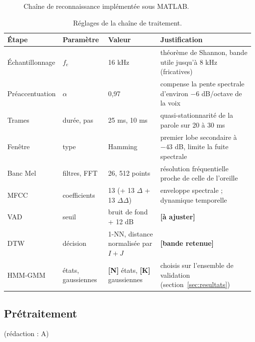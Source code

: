 \documentclass[11pt,a4paper]{article}
\newcommand{\ar}[1]{\colorbox{jaune}{\textbf{\small [#1]}}}            %
\newcommand{\redaction}[1]{\hfill{\small\color{gray}(rédaction : #1)}}   %
\begin{document}
\begin{figure}[H]\centering
{}
\caption{Chaîne de reconnaissance implémentée sous MATLAB.}\label{fig:chaine}
\end{figure}

\begin{table}[H]\centering\small
\begin{tabularx}{\linewidth}{llLL}
\toprule
Étape & Paramètre & Valeur & Justification \\
\midrule
Échantillonnage & $f_e$ & 16 kHz & théorème de Shannon, bande utile jusqu'à 8 kHz (fricatives) \\
Préaccentuation & $\alpha$ & 0,97 & compense la pente spectrale d'environ $-6$ dB/octave de la voix \\
Trames & durée, pas & 25 ms, 10 ms & quasi-stationnarité de la parole sur 20 à 30 ms \\
Fenêtre & type & Hamming & premier lobe secondaire à $-43$ dB, limite la fuite spectrale \\
Banc Mel & filtres, FFT & 26, 512 points & résolution fréquentielle proche de celle de l'oreille \\
MFCC & coefficients & 13 (+ 13 $\Delta$ + 13 $\Delta\Delta$) & enveloppe spectrale ; dynamique temporelle \\
VAD & seuil & bruit de fond + 12 dB & \ar{à ajuster} \\
DTW & décision & 1-NN, distance normalisée par $I+J$ & \ar{bande retenue} \\
HMM-GMM & états, gaussiennes & \ar{N} états, \ar{K} gaussiennes & choisis sur l'ensemble de validation (section~\ref{sec:resultats}) \\
\bottomrule
\end{tabularx}
\caption{Réglages de la chaîne de traitement.}\label{tab:reglages}
\end{table}

\subsection{Prétraitement}\redaction{A}
\end{document}
